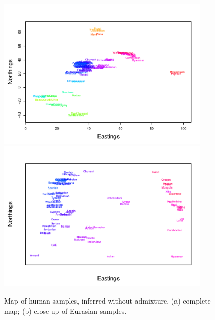\documentclass[10pt,letterpaper]{article}
\begin{document}
\begin{figure}
	\centering
			{\includegraphics[width=0.9\textwidth,height=0.738\textwidth]{../figs/globetrotter/globe_NoAd_map.pdf}}
			{\includegraphics[width=0.9\textwidth,height=0.738\textwidth]{../figs/globetrotter/globe_Eurasia_NoAd_map_indproc.pdf}}
	\caption{Map of human samples, inferred without admixture. (a) complete map; (b) close-up of Eurasian 
samples.}\label{sfig:globe_noad_maps}
\end{figure}
\end{document}
